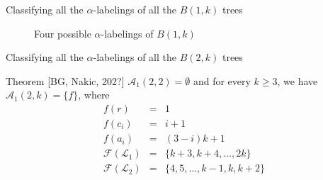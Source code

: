 \documentclass{beamer}
\begin{document}
\begin{frame}{Classifying all the \(\alpha\)-labelings of all the \( B(1, k) \) trees}
\begin{figure}[H]
\begin{minipage}{0.4\textwidth}

      \caption*{$\alpha$-labeling $f_4$ with $\alpha_4 = k - 1$} \label{fig:B(1,k)d}
    \end{minipage}
    \caption{Four possible $\alpha$-labelings of $B(1, k)$} \label{fig:B(1,k)}
  \end{figure}
\end{frame}

\begin{frame}{Classifying all the \(\alpha\)-labelings of all the \( B(2, k) \) trees}
  \begin{block}{Theorem [BG, Nakic, 202?]}
    \vbox{\parindent=0pt
      \setlength\abovedisplayskip{0pt}
      \setlength\abovedisplayshortskip{0pt}
      \setlength\belowdisplayskip{0pt}
      \setlength\belowdisplayshortskip{0pt}
      $\mathcal{A}_1(2, 2) = \emptyset$ and for every $k \ge 3$, we have $\mathcal{A}_1(2, k) = \{f\}$, where
      \vspace{-0.8em}
      {\small
        $$
        \begin{array}{lcl}
          f(r) & = & 1 \\
          f(c_i) & = & i + 1 \\
          f(a_i) & = & (3 - i)k + 1 \\
          \mathcal{F}(\mathcal{L}_1) & = & \{k + 3, k + 4, \dots, 2k\}\\
          \mathcal{F}(\mathcal{L}_2) & = & \{4, 5, \dots, k-1, k, k+2\}\\
        \end{array}
        $$
      }
    }
    \vspace{-0.8em}
  \end{block}

  \vspace*{-0.5cm}

  \begin{figure}
    \centering
\end{figure}
\end{frame}
\end{document}
